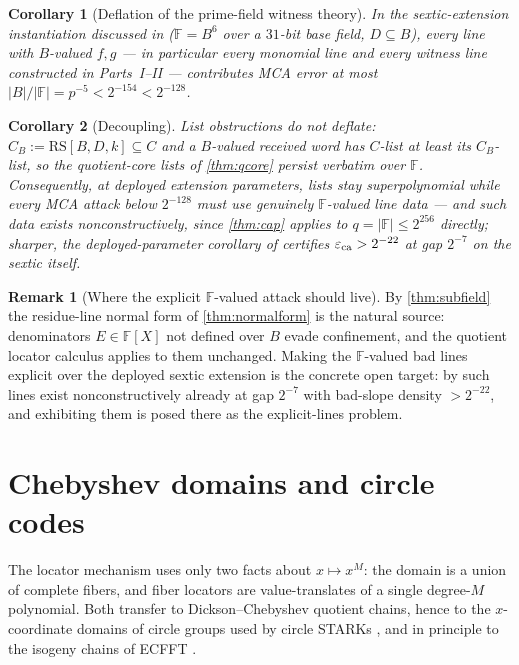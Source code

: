 \documentclass[11pt]{article}
\newtheorem{corollary}[corollary]{Corollary}
\theoremstyle{definition}
\newtheorem{remark}[remark]{Remark}
\newcommand{\F}{\mathbb F}
\newcommand{\eps}{\varepsilon}
\newcommand{\RS}{\mathrm{RS}}
\newcommand{\eca}{\eps_{\rm ca}}
\begin{document}
\begin{corollary}[Deflation of the prime-field witness theory]\label{cor:deflate}
In the sextic-extension instantiation discussed in \cite{ABF26} ($\F=B^6$ over a $31$-bit base field, $D\subseteq B$), every line with $B$-valued $f,g$ --- in particular every monomial line and every witness line constructed in Parts~I--II --- contributes MCA error at most $|B|/|\F|=p^{-5}<2^{-154}<2^{-128}$.
\end{corollary}

\begin{corollary}[Decoupling]\label{cor:decouple}
List obstructions do not deflate: $C_B:=\RS[B,D,k]\subseteq C$ and a $B$-valued received word has $C$-list at least its $C_B$-list, so the quotient-core lists of \cref{thm:qcore} persist verbatim over $\F$.  Consequently, at deployed extension parameters, lists stay superpolynomial while every MCA attack below $2^{-128}$ must use genuinely $\F$-valued line data --- and such data exists nonconstructively, since \cref{thm:cap} applies to $q=|\F|\le2^{256}$ directly; sharper, the deployed-parameter corollary of \cite{UniversalCap} certifies $\eca>2^{-22}$ at gap $2^{-7}$ on the sextic itself.
\end{corollary}

\begin{remark}[Where the explicit $\F$-valued attack should live]\label{rem:explicitattack}
By \cref{thm:subfield} the residue-line normal form of \cref{thm:normalform} is the natural source: denominators $E\in\F[X]$ not defined over $B$ evade confinement, and the quotient locator calculus applies to them unchanged.  Making the $\F$-valued bad lines explicit over the deployed sextic extension is the concrete open target: by \cite{UniversalCap} such lines exist nonconstructively already at gap $2^{-7}$ with bad-slope density $>2^{-22}$, and exhibiting them is posed there as the explicit-lines problem.
\end{remark}

\section{Chebyshev domains and circle codes}\label{sec:cheb}

The locator mechanism uses only two facts about $x\mapsto x^M$: the domain is a union of complete fibers, and fiber locators are value-translates of a single degree-$M$ polynomial.  Both transfer to Dickson--Chebyshev quotient chains, hence to the $x$-coordinate domains of circle groups used by circle STARKs \cite{HLP24}, and in principle to the isogeny chains of ECFFT \cite{ECFFT}.
\end{document}

